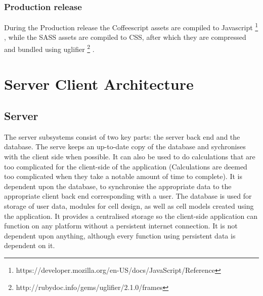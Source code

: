 \documentclass{report}
\begin{document}
			\subsubsection{Production release}
				During the Production release the Coffeescript assets are compiled to Javascript \footnote{https://developer.mozilla.org/en-US/docs/JavaScript/Reference} , while the SASS assets are compiled to CSS, after which they are compressed and bundled using uglifier \footnote{http://rubydoc.info/gems/uglifier/2.1.0/frames} . 
		\newpage
				 
		\section{Server Client Architecture}
			
			\subsection{Server}
				The server subsystems consist of two key parts: the server back end and the database. The serve keeps an up-to-date copy of the database and sychronises with the client side when possible. It can also be used to do calculations that are too complicated for the client-side of the application (Calculations are deemed too complicated when they take a notable amount of time to complete). It is dependent upon the database, to synchronise the appropriate data to the appropriate client back end corresponding with a user.
				The database is used for storage of user data, modules for cell design, as well as cell models created using the application. It provides a centralised storage so the client-side application can function on any platform without a persistent internet connection. It is not dependent upon anything, although every function using persistent data is dependent on it.	\\
\end{document}
